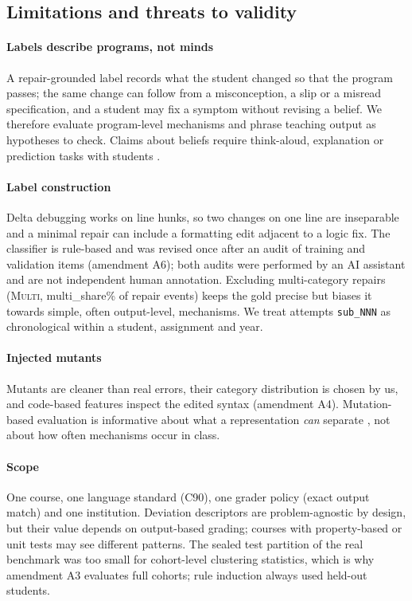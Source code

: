 \subsection{Limitations and threats to validity}\label{sec:limits}

\paragraph{Labels describe programs, not minds} A repair-grounded label records what the student changed so that the program passes; the same change can follow from a misconception, a slip or a misread specification, and a student may fix a symptom without revising a belief. We therefore evaluate program-level mechanisms and phrase teaching output as hypotheses to check. Claims about beliefs require think-aloud, explanation or prediction tasks with students \citep{lu2024smol}.

\paragraph{Label construction} Delta debugging works on line hunks, so two changes on one line are inseparable and a minimal repair can include a formatting edit adjacent to a logic fix. The classifier is rule-based and was revised once after an audit of training and validation items (amendment A6); both audits were performed by an AI assistant and are not independent human annotation. Excluding multi-category repairs (\textsc{Multi}, {{multi_share}}\% of repair events) keeps the gold precise but biases it towards simple, often output-level, mechanisms. We treat attempts \texttt{sub\_NNN} as chronological within a student, assignment and year.

\paragraph{Injected mutants} Mutants are cleaner than real errors, their category distribution is chosen by us, and code-based features inspect the edited syntax (amendment A4). Mutation-based evaluation is informative about what a representation \emph{can} separate \citep{just2014mutants}, not about how often mechanisms occur in class.

\paragraph{Scope} One course, one language standard (C90), one grader policy (exact output match) and one institution. Deviation descriptors are problem-agnostic by design, but their value depends on output-based grading; courses with property-based or unit tests may see different patterns. The sealed test partition of the real benchmark was too small for cohort-level clustering statistics, which is why amendment A3 evaluates full cohorts; rule induction always used held-out students.

